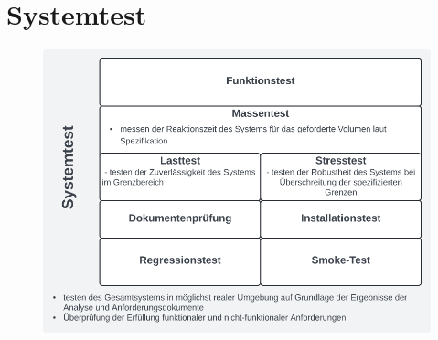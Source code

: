 \section{Systemtest}


\begin{figure}
    \centering
    \includegraphics[scale=0.5]{chapters/Anhang/CheatSheets/img/systemtest}
\end{figure}